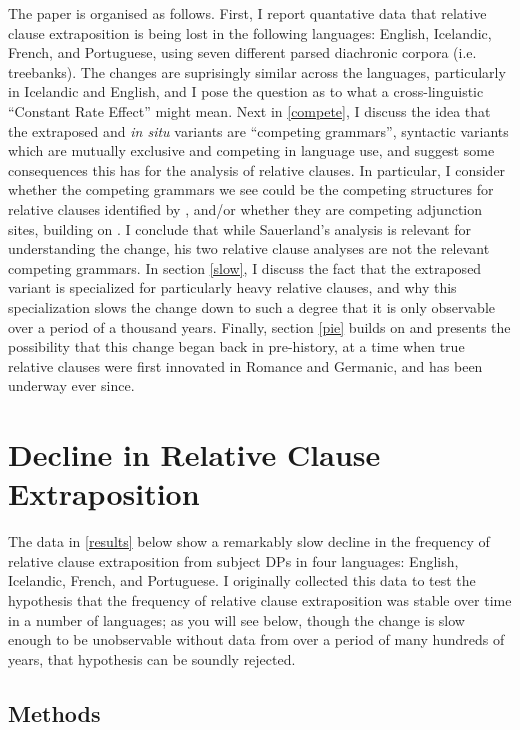 The paper is organised as follows.
First, I report quantative data that relative clause extraposition is being lost in the following languages: English, Icelandic, French, and Portuguese, using seven different parsed diachronic corpora (i.e. treebanks).
The changes are suprisingly similar across the languages, particularly in Icelandic and English, and I pose the question as to what a cross-linguistic ``Constant Rate Effect'' \citep{kroch1989} might mean.
Next in \ref{compete}, I discuss the idea that the extraposed and \textsl{in situ} variants are ``competing grammars'', syntactic variants which are mutually exclusive and competing in language use, and suggest some consequences this has for the analysis of relative clauses. In particular, I consider whether the competing grammars we see could be the competing structures for relative clauses identified by \citet{sauerland2003}, and/or whether they are competing adjunction sites, building on \citet{culicoverrochemont1990}. I conclude that while Sauerland's analysis is relevant for understanding the change, his two relative clause analyses are not the relevant competing grammars.
In section \ref{slow}, I discuss the fact that the extraposed variant is specialized for particularly heavy relative clauses, and why this specialization slows the change down to such a degree that it is only observable over a period of a thousand years.
Finally, section \ref{pie} builds on \citet{kiparsky1995} and presents the possibility that this change began back in pre-history, at a time when true relative clauses were first innovated in Romance and Germanic, and has been underway ever since.



\section{Decline in Relative Clause Extraposition}
\label{relclause}

The data in \ref{results} below show a remarkably slow decline in the frequency of relative clause extraposition from subject DPs in four languages: English, Icelandic, French, and Portuguese. I originally collected this data to test the hypothesis that the frequency of relative clause extraposition was stable over time in a number of languages; as you will see below, though the change is slow enough to be unobservable without data from over a period of many hundreds of years, that hypothesis can be soundly rejected.

\subsection{Methods}
\label{methods}

